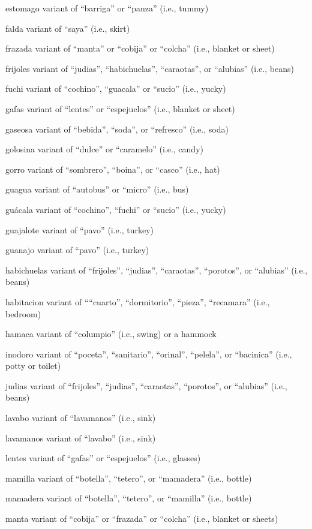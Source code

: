 \documentclass[
  12pt,
]{book}
\begin{document}
estomago
variant of ``barriga'' or ``panza'' (i.e., tummy)

falda
variant of ``saya'' (i.e., skirt)

frazada
variant of ``manta'' or ``cobija'' or ``colcha'' (i.e., blanket or sheet)

frijoles
variant of ``judias'', ``habichuelas'', ``caraotas'', or ``alubias'' (i.e., beans)

fuchi
variant of ``cochino'', ``guacala'' or ``sucio'' (i.e., yucky)

gafas
variant of ``lentes'' or ``espejuelos'' (i.e., blanket or sheet)

gaseosa
variant of ``bebida'', ``soda'', or ``refresco'' (i.e., soda)

golosina
variant of ``dulce'' or ``caramelo'' (i.e., candy)

gorro
variant of ``sombrero'', ``boina'', or ``casco'' (i.e., hat)

guagua
variant of ``autobus'' or ``micro'' (i.e., bus)

guácala
variant of ``cochino'', ``fuchi'' or ``sucio'' (i.e., yucky)

guajalote
variant of ``pavo'' (i.e., turkey)

guanajo
variant of ``pavo'' (i.e., turkey)

habichuelas
variant of ``frijoles'', ``judias'', ``caraotas'', ``porotos'', or ``alubias'' (i.e., beans)

habitacion
variant of ````cuarto'', ``dormitorio'', ``pieza'', ``recamara'' (i.e., bedroom)

hamaca
variant of ``columpio'' (i.e., swing) or a hammock

inodoro
variant of ``poceta'', ``sanitario'', ``orinal'', ``pelela'', or ``bacinica'' (i.e., potty or toilet)

judias
variant of ``frijoles'', ``judias'', ``caraotas'', ``porotos'', or ``alubias'' (i.e., beans)

lavabo
variant of ``lavamanos'' (i.e., sink)

lavamanos
variant of ``lavabo'' (i.e., sink)

lentes
variant of ``gafas'' or ``espejuelos'' (i.e., glasses)

mamilla
variant of ``botella'', ``tetero'', or ``mamadera'' (i.e., bottle)

mamadera
variant of ``botella'', ``tetero'', or ``mamilla'' (i.e., bottle)

manta
variant of ``cobija'' or ``frazada'' or ``colcha'' (i.e., blanket or sheets)
\end{document}
